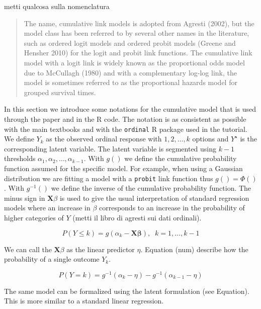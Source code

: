 \documentclass[
  man,floatsintext]{apa6}
\begin{document}
metti qualcosa sulla nomenclatura

\begin{quote}
The name, cumulative link models is adopted from Agresti (2002), but the model class has
been referred to by several other names in the literature, such as ordered logit models and
ordered probit models (Greene and Hensher 2010) for the logit and probit link functions. The
cumulative link model with a logit link is widely known as the proportional odds model due
to McCullagh (1980) and with a complementary log-log link, the model is sometimes referred
to as the proportional hazards model for grouped survival times.
\end{quote}

In this section we introduce some notations for the cumulative model that is used through the paper and in the R code. The notation is as consistent as possible with the main textbooks and with the \texttt{ordinal} R package used in the tutorial. We define \(Y_k\) as the observed ordinal response with \(1, 2, \dots,k\) options and \(Y^\star\) is the corresponding latent variable. The latent variable is segmented using \(k - 1\) thresholds \(\alpha_1, \alpha_2, \dots, \alpha_{k - 1}\). With \(g()\) we define the cumulative probability function assumed for the specific model. For example, when using a Gaussian distribution we are fitting a model with a \texttt{probit} link function thus \(g() = \Phi()\). With \(g^{-1}()\) we define the inverse of the cumulative probability function. The minus sign in \(\mathbf{X} \beta\) is used to give the usual interpretation of standard regression models where an increase in \(\beta\) corresponds to an increase in the probability of higher categories of \(Y\) (metti il libro di agresti sui dati ordinali).

\begin{equation} 
P(Y \leq k) = g(\alpha_k - \mathbf{X} \mathbf{\beta}), \;\;k = 1, \dots, k - 1
\label{eq:prob-cum-model1}
\end{equation}

We can call the \(\mathbf{X} \beta\) as the linear predictor \(\eta\). Equation (num) describe how the probability of a single outcome \(Y_k\).

\begin{equation} 
P(Y = k) = g^{-1}(\alpha_k - \eta) -  g^{-1}(\alpha_{k - 1} - \eta)
\label{eq:prob-cum-model2}
\end{equation}

The same model can be formalized using the latent formulation (see Equation). This is more similar to a standard linear regression.
\end{document}
